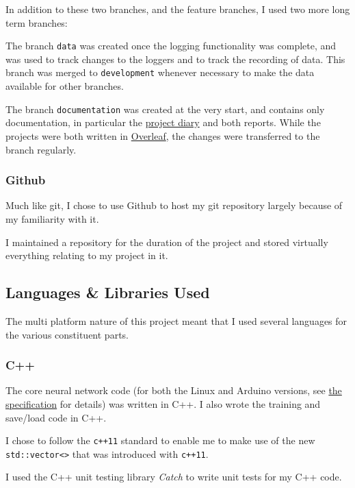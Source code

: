 \documentclass[a4paper]{article}
\begin{document}
In addition to these two branches, and the feature branches, I used two more long term branches:

The branch \lstinline{data} was created once the logging functionality was complete, and was used to track changes to the loggers and to track the recording of data. This branch was merged to \lstinline{development} whenever necessary to make the data available for other branches.

The branch \lstinline{documentation} was created at the very start, and contains only documentation, in particular the \hyperref[subsec:a3_pd]{project diary} and both reports. While the projects were both written in \hyperref[subsubsec:pp_ts_overleaf]{Overleaf}, the changes were transferred to the branch regularly.

\subsubsection{Github}

Much like git, I chose to use Github\cite{ppref2} to host my git repository largely because of my familiarity with it. 

I maintained a repository\cite{ppref3} for the duration of the project and stored virtually everything relating to my project in it.

\subsection{Languages \& Libraries Used}%
\label{subsec:pp_ll}

The multi platform nature of this project meant that I used several languages for the various constituent parts.

\subsubsection{C++}

The core neural network code (for both the Linux and Arduino versions, see \hyperref[sec:dn]{the specification} for details) was written in C++\cite{ppref4}. I also wrote the training and save/load code in C++.

I chose to follow the \lstinline{c++11}\cite{ppref5} standard to enable me to make use of the new \lstinline{std::vector<>} that was introduced with \lstinline{c++11}.

I used the C++ unit testing library \textit{Catch}\cite{ppref6} to write unit tests for my C++ code.
\end{document}
